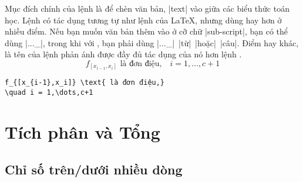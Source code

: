 Mục đích chính của lệnh  là để chèn văn bản, |text| vào giữa
các biểu thức toán học. Lệnh có tác dụng tương tự như lệnh 
của \LaTeX{}, nhưng dùng  hay hơn ở nhiều điểm.
Nếu bạn muốn văn bản thêm vào ở cỡ chữ |sub-script|, bạn có thể dùng
|..._{}|, trong khi với , bạn phải dùng
|..._{\mbox{\scriptsize| |từ| |hoặc| |câu}}|. Điểm hay khác, là tên của
lệnh  phản ánh được đầy đủ tác dụng của nó hơn lệnh .
\begin{equation}
f_{[x_{i-1},x_i]} \text{ là đơn điệu,}
\quad i = 1,\dots,c+1
\end{equation}
\begin{verbatim}
f_{[x_{i-1},x_i]} \text{ là đơn điệu,}
\quad i = 1,\dots,c+1
\end{verbatim}

\chapter{Tích phân và Tổng}

\section{Chỉ số trên/dưới nhiều dòng}

